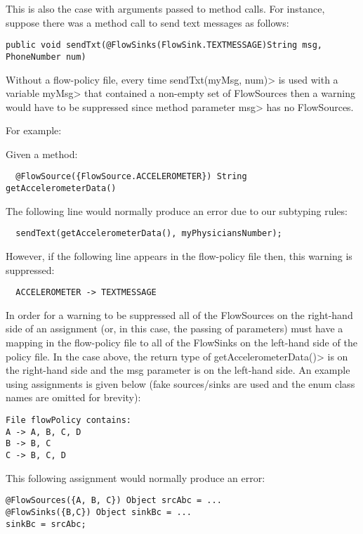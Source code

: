 This is also the case with arguments passed to method calls.  For instance, suppose there
was a method call to send text messages as follows:
\begin{Verbatim}
public void sendTxt(@FlowSinks(FlowSink.TEXTMESSAGE)String msg, PhoneNumber num)
\end{Verbatim}

Without a flow-policy file, every time \<sendTxt(myMsg, num)> is
used with a variable \<myMsg> that contained a non-empty set of
FlowSources then a warning would have to be suppressed since method
parameter \<msg> has no FlowSources.

For example:

Given a method:
\begin{Verbatim}
  @FlowSource({FlowSource.ACCELEROMETER}) String getAccelerometerData()
\end{Verbatim}

The following line would normally produce an error due to our subtyping rules:
\begin{Verbatim}
  sendText(getAccelerometerData(), myPhysiciansNumber);
\end{Verbatim}

However, if the following line appears in the flow-policy file then, this warning is suppressed:
\begin{Verbatim}
  ACCELEROMETER -> TEXTMESSAGE
\end{Verbatim}

In order for a warning to be suppressed all of the FlowSources
on the right-hand side of an assignment (or, in this case, the
passing of parameters) must have a mapping in the flow-policy
file to all of the FlowSinks on the left-hand side of the policy
file.  In the case above, the return type of
\<getAccelerometerData()> is on the right-hand side and the
msg parameter is on the left-hand side.  An example using
assignments is given below  (fake sources/sinks are used and the
enum class names are omitted for brevity):

\begin{Verbatim}
File flowPolicy contains:
A -> A, B, C, D
B -> B, C
C -> B, C, D
\end{Verbatim}

This following assignment would normally produce an error:
\begin{Verbatim}
@FlowSources({A, B, C}) Object srcAbc = ...
@FlowSinks({B,C}) Object sinkBc = ...
sinkBc = srcAbc;
\end{Verbatim}


